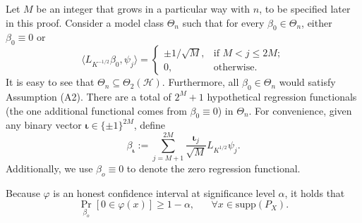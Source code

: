 \documentclass[11pt,a4paper]{article}
\newcommand{\vct}{\boldsymbol}
\theoremstyle{definition}
\theoremstyle{plain}
\theoremstyle{remark}
\newcommand{\supp}{\mathrm{supp}}
\newcommand{\mH}{\mathcal H}
\begin{document}
Let $M$ be an integer that grows in a particular way with $n$, to be specified later in this proof. 
Consider a model class $\Theta_n$ such that for every $\beta_0\in\Theta_n$, either $\beta_0\equiv 0$ or
$$
\langle L_{K^{-1/2}}\beta_0, \psi_j\rangle = \left\{\begin{array}{ll} \pm 1/\sqrt{M},& \text{if }M< j\leq 2M;\\ 0,& \text{otherwise}.\end{array}\right.
$$
It is easy to see that $\Theta_n\subseteq\Theta_2(\mH)$. Furthermore, all $\beta_0\in\Theta_n$ would satisfy Assumption (A2).
There are a total of $2^M+1$ hypothetical regression functionals (the one additional functional comes from $\beta_0\equiv 0$) in $\Theta_n$.
For convenience, given any binary vector $\vct\iota\in\{\pm 1\}^{2M}$, define
$$
\beta_{\vct\iota} := \sum_{j=M+1}^{2M}\frac{\vct\iota_j}{\sqrt{M}} L_{K^{1/2}}\psi_j.
$$
Additionally, we use $\beta_o\equiv 0$ to denote the zero regression functional.

Because $\varphi$ is an honest confidence interval at significance level $\alpha$, it holds that 
\begin{equation}
\Pr_{\beta_o}\left[0\in\varphi(x)\right] \geq 1-\alpha,\;\;\;\;\;\;\forall x\in\supp(P_X).
\label{eq:proof-isolb-1}
\end{equation}
\end{document}
